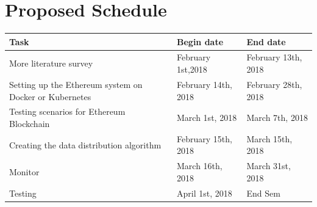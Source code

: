 \documentclass[conference]{IEEEtran}
\begin{document}
\section{Proposed Schedule}
\begin{tabular}{|p{2cm}||p{2cm}||p{2cm}|}
    \hline
    \textbf{Task} & \textbf{Begin date} & \textbf{End date} \\
    \hline
    More literature survey & February 1st,2018 & February 13th, 2018 \\
    \hline
    Setting up the Ethereum system on Docker or Kubernetes & February 14th, 2018 & February 28th, 2018 \\
    \hline
    Testing scenarios for Ethereum Blockchain & March 1st, 2018 & March 
    7th, 2018 \\
    \hline
    Creating the data distribution algorithm & February 15th, 2018 & March 15th, 2018 \\
    \hline
    Monitor & March 16th, 2018 & March 31st, 2018 \\
    \hline
    Testing & April 1st, 2018 & End Sem \\
    \hline
\end{tabular}
\end{document}
